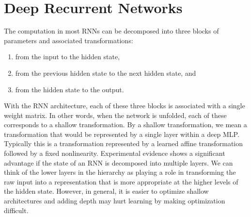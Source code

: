 \section{Deep Recurrent Networks}
The computation in most RNNs can be decomposed into three blocks of parameters
and associated transformations:
\begin{enumerate}
    \item  from the input to the hidden state,
    \item  from the previous hidden state to the next hidden state, and
    \item  from the hidden state to the output.
\end{enumerate}
With the RNN architecture, each of these three blocks is associated with a single weight matrix. In other words, when the network is unfolded, each of these corresponds to a shallow transformation. By a shallow transformation, we mean a transformation that would be represented by a single layer within a deep MLP. Typically this is a transformation represented by a learned affine transformation followed by a fixed nonlinearity.\newline\newline
Experimental evidence shows a significant advantage if the state of an RNN is decomposed into multiple layers.  We can think of the lower layers in the hierarchy as playing a role in transforming the raw input into a representation that is more appropriate at the higher levels of the hidden state.\newline\newline
However, in general, it is easier to optimize shallow architectures and adding depth may hurt learning by making optimization difficult.

